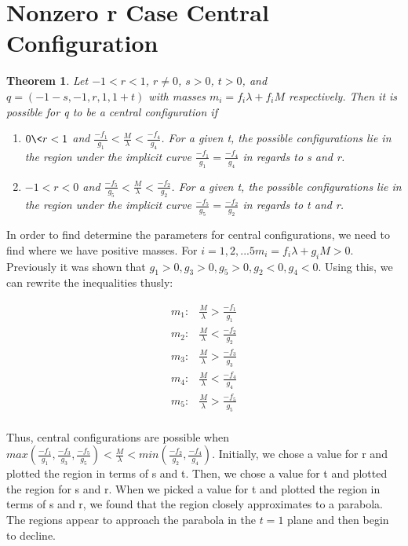 \documentclass[11pt,leqno]{article}
\newtheorem{theorem}{Theorem}[section]
\theoremstyle{definition}
\theoremstyle{remark}
\numberwithin{equation}{section}
\begin{document}
\section{Nonzero r Case Central Configuration}

\begin{theorem}\label{thm5}
\emph{Let $-1<r<1$, $r\neq0$, $s>0$, $t>0$, and $q=(-1-s,-1,r,1,1+t)$
with masses $m_{i}=f_{i}\lambda+f_{i}M$ respectively. Then it is possible for q to be a
central configuration if }
\begin{enumerate}
\item \emph{$0\< r<1$ and $\frac{-f_{1}}{g_{1}}<\frac{M}{\lambda}<\frac{-f_{4}}{g_{4}}$.
For a given t, the possible configurations lie in the region under
the implicit curve $\frac{-f_{1}}{g_{1}}=\frac{-f_{4}}{g_{4}}$ in
regards to s and r.}
\item \emph{$-1<r<0$ and $\frac{-f_{5}}{g_{5}}<\frac{M}{\lambda}<\frac{-f_{2}}{g_{2}}$.
For a given t, the possible configurations lie in the region under
the implicit curve $\frac{-f_{5}}{g_{5}}=\frac{-f_{2}}{g_{2}}$ in
regards to t and r.}\end{enumerate}
\end{theorem}

In order to find determine the parameters for central configurations, we need to find where we have positive masses. For $i={1,2,...5} m_i = f_i\lambda + g_iM > 0$. Previously it was shown that $g_1 > 0, g_3 > 0, g_5 > 0, g_2 < 0, g_4 < 0$. Using this, we can rewrite the inequalities thusly: 

\begin{equation} \begin{array}{ll}
m_1: & \frac{M}{\lambda} > \frac{-f_1}{g_1} \\
m_2: & \frac{M}{\lambda} < \frac{-f_2}{g_2} \\
m_3: & \frac{M}{\lambda} > \frac{-f_3}{g_3} \\
m_4: & \frac{M}{\lambda} < \frac{-f_4}{g_4} \\
m_5: & \frac{M}{\lambda} > \frac{-f_5}{g_5} \\
\end{array}
\end{equation}

Thus, central configurations are possible when $max(\frac{-f_1}{g_1},\frac{-f_3}{g_3},\frac{-f_5}{g_5})<\frac{M}{\lambda}<min(\frac{-f_2}{g_2},\frac{-f_4}{g_4})$. Initially, we chose a value for r and plotted the region in terms of s and t. Then, we chose a value for t and plotted the region for s and r. When we picked a value for t and plotted the region in terms of s and r, we found that the region closely approximates to a parabola. The regions appear to approach the parabola in the $t=1$ plane and then begin to decline.
\end{document}
